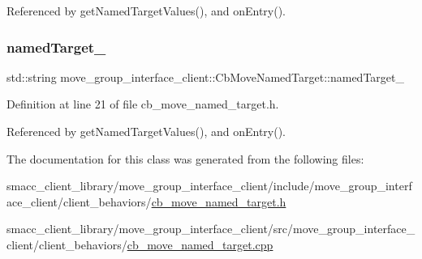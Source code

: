 Referenced by get\+Named\+Target\+Values(), and on\+Entry().

\mbox{\label{classmove__group__interface__client_1_1CbMoveNamedTarget_a1e985a12ca30e0c6946a28940504f036}} 
\subsubsection{\texorpdfstring{named\+Target\+\_\+}{namedTarget\_}}
{\footnotesize\ttfamily std\+::string move\+\_\+group\+\_\+interface\+\_\+client\+::\+Cb\+Move\+Named\+Target\+::named\+Target\+\_\+\hspace{0.3cm}{\ttfamily [protected]}}



Definition at line 21 of file cb\+\_\+move\+\_\+named\+\_\+target.\+h.



Referenced by get\+Named\+Target\+Values(), and on\+Entry().



The documentation for this class was generated from the following files\+:\begin{DoxyCompactItemize}
\item 
smacc\+\_\+client\+\_\+library/move\+\_\+group\+\_\+interface\+\_\+client/include/move\+\_\+group\+\_\+interface\+\_\+client/client\+\_\+behaviors/\hyperlink{cb__move__named__target_8h}{cb\+\_\+move\+\_\+named\+\_\+target.\+h}\item 
smacc\+\_\+client\+\_\+library/move\+\_\+group\+\_\+interface\+\_\+client/src/move\+\_\+group\+\_\+interface\+\_\+client/client\+\_\+behaviors/\hyperlink{cb__move__named__target_8cpp}{cb\+\_\+move\+\_\+named\+\_\+target.\+cpp}\end{DoxyCompactItemize}
